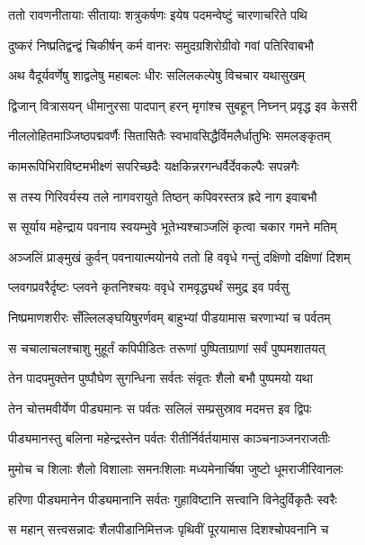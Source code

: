 
\twolineshloka
{ततो रावणनीतायाः सीतायाः शत्रुकर्षणः}
{इयेष पदमन्वेष्टुं चारणाचरिते पथि} %

\twolineshloka
{दुष्करं निष्प्रतिद्वन्द्वं चिकीर्षन् कर्म वानरः}
{समुदग्रशिरोग्रीवो गवां पतिरिवाबभौ} %

\twolineshloka
{अथ वैदूर्यवर्णेषु शाद्वलेषु महाबलः}
{धीरः सलिलकल्पेषु विचचार यथासुखम्} %

\twolineshloka
{द्विजान् वित्रासयन् धीमानुरसा पादपान् हरन्}
{मृगांश्च सुबहून् निघ्नन् प्रवृद्ध इव केसरी} %

\twolineshloka
{नीललोहितमाञ्जिष्ठपद्मवर्णैः सितासितैः}
{स्वभावसिद्धैर्विमलैर्धातुभिः समलङ्कृतम्} %

\twolineshloka
{कामरूपिभिराविष्टमभीक्ष्णं सपरिच्छदैः}
{यक्षकिन्नरगन्धर्वैर्देवकल्पैः सपन्नगैः} %

\twolineshloka
{स तस्य गिरिवर्यस्य तले नागवरायुते}
{तिष्ठन् कपिवरस्तत्र ह्रदे नाग इवाबभौ} %

\twolineshloka
{स सूर्याय महेन्द्राय पवनाय स्वयम्भुवे}
{भूतेभ्यश्चाञ्जलिं कृत्वा चकार गमने मतिम्} %

\twolineshloka
{अञ्जलिं प्राङ्मुखं कुर्वन् पवनायात्मयोनये}
{ततो हि ववृधे गन्तुं दक्षिणो दक्षिणां दिशम्} %

\twolineshloka
{प्लवगप्रवरैर्दृष्टः प्लवने कृतनिश्चयः}
{ववृधे रामवृद्ध्यर्थं समुद्र इव पर्वसु} %

\twolineshloka
{निष्प्रमाणशरीरः सँल्लिलङ्घयिषुरर्णवम्}
{बाहुभ्यां पीडयामास चरणाभ्यां च पर्वतम्} %

\twolineshloka
{स चचालाचलश्चाशु मुहूर्तं कपिपीडितः}
{तरूणां पुष्पिताग्राणां सर्वं पुष्पमशातयत्} %

\twolineshloka
{तेन पादपमुक्तेन पुष्पौघेण सुगन्धिना}
{सर्वतः संवृतः शैलो बभौ पुष्पमयो यथा} %

\twolineshloka
{तेन चोत्तमवीर्येण पीड्यमानः स पर्वतः}
{सलिलं सम्प्रसुस्राव मदमत्त इव द्विपः} %

\twolineshloka
{पीड्यमानस्तु बलिना महेन्द्रस्तेन पर्वतः}
{रीतीर्निर्वर्तयामास काञ्चनाञ्जनराजतीः} %

\twolineshloka
{मुमोच च शिलाः शैलो विशालाः समनःशिलाः}
{मध्यमेनार्चिषा जुष्टो धूमराजीरिवानलः} %

\twolineshloka
{हरिणा पीड्यमानेन पीड्यमानानि सर्वतः}
{गुहाविष्टानि सत्त्वानि विनेदुर्विकृतैः स्वरैः} %

\twolineshloka
{स महान् सत्त्वसन्नादः शैलपीडानिमित्तजः}
{पृथिवीं पूरयामास दिशश्चोपवनानि च} %

